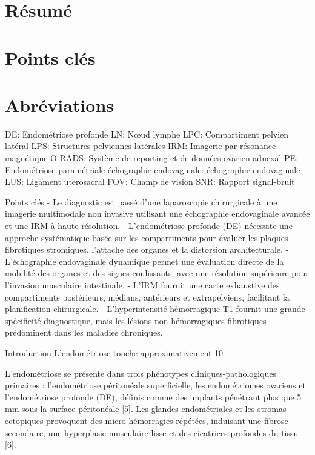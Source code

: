 \documentclass[11pt,a4paper]{article}
\begin{document}
\section{Résumé}
\section{Points clés}
\section{Abréviations}
DE: Endométriose profonde LN: Nœud lymphe LPC: Compartiment pelvien latéral LPS: Structures pelviennes latérales IRM: Imagerie par résonance magnétique O-RADS: Système de reporting et de données ovarien-adnexal PE: Endométriose paramétriale échographie endovaginale: échographie endovaginale LUS: Ligament uterosacral FOV: Champ de vision SNR: Rapport signal-bruit

Points clés - Le diagnostic est passé d'une laparoscopie chirurgicale à une imagerie multimodale non invasive utilisant une échographie endovaginale avancée et une IRM à haute résolution. - L'endométriose profonde (DE) nécessite une approche systématique basée sur les compartiments pour évaluer les plaques fibrotiques stromiques, l'attache des organes et la distorsion architecturale. - L'échographie endovaginale dynamique permet une évaluation directe de la mobilité des organes et des signes coulissants, avec une résolution supérieure pour l'invasion musculaire intestinale. - L'IRM fournit une carte exhaustive des compartiments postérieurs, médians, antérieurs et extrapelviens, facilitant la planification chirurgicale. - L'hyperintensité hémorragique T1 fournit une grande spécificité diagnostique, mais les lésions non hémorragiques fibrotiques prédominent dans les maladies chroniques.

Introduction L'endométriose touche approximativement 10%

L'endométriose se présente dans trois phénotypes cliniques-pathologiques primaires : l'endométriose péritonéale superficielle, les endométriomes ovariens et l'endométriose profonde (DE), définis comme des implants pénétrant plus que 5 mm sous la surface péritonéale [5]. Les glandes endométriales et les stromas ectopiques provoquent des micro-hémorragies répétées, induisant une fibrose secondaire, une hyperplasie musculaire lisse et des cicatrices profondes du tissu [6].
\end{document}
